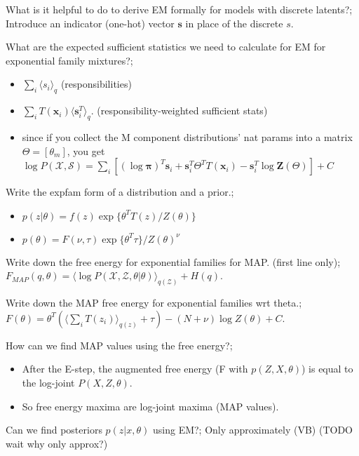 \documentclass{article}
\begin{document}
What is it helpful to do to derive EM formally for models with discrete latents?; Introduce an indicator (one-hot) vector $\mathbf{s}$ in place of the discrete $s$.

What are the expected sufficient statistics we need to calculate for EM for exponential family mixtures?; \begin{itemize} \item $\sum_i \langle s_i \rangle_{q}$ (responsibilities) \item $\sum_i T(\mathbf{x}_i)\langle \mathbf{s}_i^T \rangle_q$. (responsibility-weighted sufficient stats) \item since if you collect the M component distributions' nat params into a matrix $\Theta=[\theta_m]$, you get $\log P(\mathcal{X, S})=\sum_i [(\log \mathbf{\pi})^T\mathbf{s}_i + \mathbf{s}_i^T\Theta^T T(\mathbf{x}_i) - \mathbf{s}_i^T\log \mathbf{Z}(\Theta)]+C$ \end{itemize}


Write the expfam form of a distribution and a prior.; \begin{itemize} \item $p(z|\theta) = f(z)\exp\{\theta^T T(z)/Z(\theta)\}$ \item $p(\theta) = F(\nu, \tau)\exp\{\theta^T\tau\}/Z(\theta)^\nu$ \end{itemize}

Write down the free energy for exponential families for MAP. (first line only);  $F_{MAP}(q,\theta) = \langle \log P(\mathcal{X, Z, \theta}|\theta)\rangle_{q(\mathcal{Z})}+H(q)$.

Write down the MAP free energy for exponential families wrt theta.;  $F(\theta) = \theta^T(\langle \sum_i T(z_i) \rangle_{q(z)} + \tau)- (N+\nu) \log Z(\theta) + C$.

How can we find MAP values using the free energy?; \begin{itemize} \item After the E-step, the augmented free energy (F with $p(Z, X, \theta)$) is equal to the log-joint $P(X, Z, \theta)$.  \item So free energy maxima are log-joint maxima (MAP values).  \end{itemize}

Can we find posteriors $p(z|x, \theta)$ using EM?; Only approximately (VB) (TODO wait why only approx?)
\end{document}
